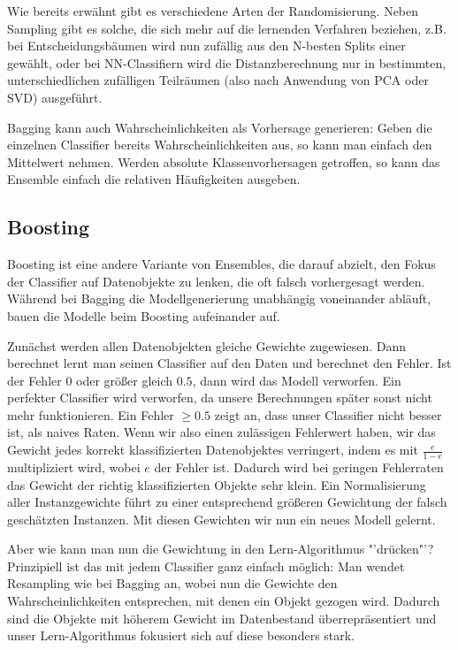 Wie bereits erwähnt gibt es verschiedene Arten der Randomisierung. Neben
Sampling gibt es solche, die sich mehr auf die lernenden Verfahren beziehen,
z.B. bei Entscheidungsbäumen wird nun zufällig aus den N-besten Splits einer
gewählt, oder bei NN-Classifiern wird die Distanzberechnung nur in bestimmten,
unterschiedlichen zufälligen Teilräumen (also nach Anwendung von PCA oder SVD) 
ausgeführt.

Bagging kann auch Wahrscheinlichkeiten als Vorhersage generieren: Geben die
einzelnen Classifier bereits Wahrscheinlichkeiten aus, so kann man einfach den 
Mittelwert nehmen. Werden absolute Klassenvorhersagen getroffen, so kann 
das Ensemble einfach die relativen Häufigkeiten ausgeben.

\subsection{Boosting}
Boosting ist eine andere Variante von Ensembles, die darauf abzielt, den Fokus
der Classifier auf Datenobjekte zu lenken, die oft falsch vorhergesagt werden.
Während bei Bagging die Modellgenerierung unabhängig voneinander abläuft,
bauen die Modelle beim Boosting aufeinander auf.

Zunächst werden allen Datenobjekten gleiche Gewichte zugewiesen. Dann berechnet
lernt man seinen Classifier auf den Daten und berechnet den Fehler. Ist der Fehler
0 oder größer gleich \(0.5\), dann wird das Modell verworfen. Ein perfekter Classifier
wird verworfen, da unsere Berechnungen später sonst nicht mehr funktionieren.
Ein Fehler \(\geq 0.5\) zeigt an, dass unser Classifier nicht besser ist,
als naives Raten. Wenn wir also einen zulässigen Fehlerwert haben,
wir das Gewicht jedes korrekt klassifizierten Datenobjektes verringert,
indem es mit \(\frac{e}{1-e}\) multipliziert wird, wobei \(e\) der Fehler ist.
Dadurch wird bei geringen Fehlerraten das Gewicht der richtig klassifizierten 
Objekte sehr klein. Ein Normalisierung aller Instanzgewichte führt zu einer
entsprechend größeren Gewichtung der falsch geschätzten Instanzen. Mit diesen
Gewichten wir nun ein neues Modell gelernt.

Aber wie kann man nun die Gewichtung in den Lern-Algorithmus "'drücken"'?
Prinzipiell ist das mit jedem Classifier ganz einfach möglich: Man wendet 
Resampling wie bei Bagging an, wobei nun die Gewichte den Wahrscheinlichkeiten
entsprechen, mit denen ein Objekt gezogen wird. Dadurch sind die Objekte mit 
höherem Gewicht im Datenbestand überrepräsentiert und unser Lern-Algorithmus
fokusiert sich auf diese besonders stark. 


